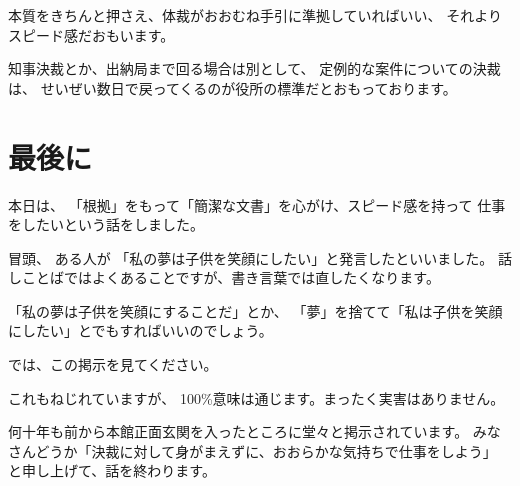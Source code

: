 \documentclass[uplatex,jis2004,dvipdfmx,12pt]{jsarticle}
\begin{document}
本質をきちんと押さえ、体裁がおおむね手引に準拠していればいい、
それよりスピード感だおもいます。


知事決裁とか、出納局まで回る場合は別として、
定例的な案件についての決裁は、
せいぜい数日で戻ってくるのが役所の標準だとおもっております。



\section{最後に}
本日は、
「根拠」をもって「簡潔な文書」を心がけ、スピード感を持って
仕事をしたいという話をしました。

冒頭、
ある人が
「私の夢は子供を笑顔にしたい」と発言したといいました。
話しことばではよくあることですが、書き言葉では直したくなります。

「私の夢は子供を笑顔にすることだ」とか、
「夢」を捨てて「私は子供を笑顔にしたい」とでもすればいいのでしょう。

では、この掲示を見てください。

これもねじれていますが、
100\%意味は通じます。まったく実害はありません。


何十年も前から本館正面玄関を入ったところに堂々と掲示されています。
みなさんどうか「決裁に対して身がまえずに、おおらかな気持ちで仕事をしよう」
と申し上げて、話を終わります。
\end{document}
